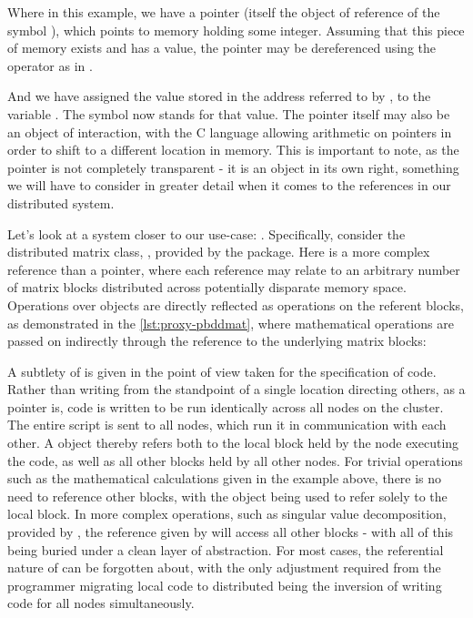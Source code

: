 
Where in this example, we have a pointer (itself the object of reference of the symbol ), which points to memory holding some integer.
Assuming that this piece of memory exists and has a value, the pointer may be dereferenced using the  operator as in .

And we have assigned the value stored in the address referred to by , to the variable .
The symbol  now stands for that value.
The pointer itself may also be an object of interaction, with the C language allowing arithmetic on pointers in order to shift to a different location in memory.
This is important to note, as the pointer is not completely transparent - it is an object in its own right, something we will have to consider in greater detail when it comes to the references in our distributed system.

Let's look at a system closer to our use-case: .
Specifically, consider the distributed matrix class, , provided by the  package.
Here is a more complex reference than a pointer, where each  reference may relate to an arbitrary number of matrix blocks distributed across potentially disparate memory space.
Operations over  objects are directly reflected as operations on the referent blocks, as demonstrated in the \cref{lst:proxy-pbddmat}, where mathematical operations are passed on indirectly through the  reference to the underlying matrix blocks:


A subtlety of  is given in the point of view taken for the specification of code.
Rather than writing from the standpoint of a single location directing others, as a pointer is,  code is written to be run identically across all nodes on the cluster.
The entire script is sent to all nodes, which run it in communication with each other.
A  object thereby refers both to the local block held by the node executing the code, as well as all other blocks held by all other nodes.
For trivial operations such as the mathematical calculations given in the example above, there is no need to reference other blocks, with the  object being used to refer solely to the local block.
In more complex operations, such as singular value decomposition, provided by , the reference given by  will access all other blocks - with all of this being buried under a clean layer of abstraction.
For most cases, the referential nature of  can be forgotten about, with the only adjustment required from the programmer migrating local code to distributed being the inversion of writing code for all nodes simultaneously.

